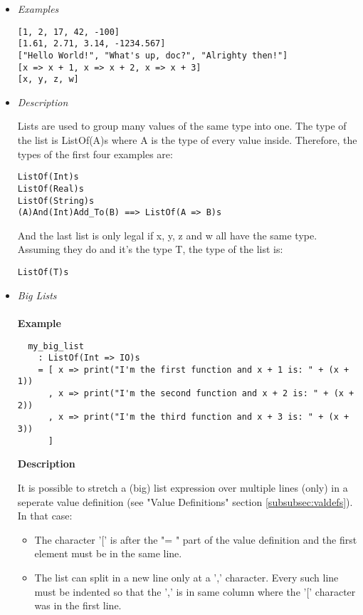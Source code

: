 \documentclass{article}
\begin{document}
\begin{itemize}

\item \textit{Examples}
\begin{verbatim}
[1, 2, 17, 42, -100]
[1.61, 2.71, 3.14, -1234.567]
["Hello World!", "What's up, doc?", "Alrighty then!"]
[x => x + 1, x => x + 2, x => x + 3]
[x, y, z, w]
\end{verbatim}

\item \textit{Description}

Lists are used to group many values of the same type into one. 
The type of the list is ListOf(A)s where A is the type of every value inside.
Therefore, the types of the first four examples are:
\begin{verbatim}
ListOf(Int)s
ListOf(Real)s
ListOf(String)s
(A)And(Int)Add_To(B) ==> ListOf(A => B)s
\end{verbatim}
And the last list is only legal if x, y, z and w all have the same type. Assuming 
they do and it's the type T, the type of the list is: 
\begin{verbatim}
ListOf(T)s
\end{verbatim}

\item \textit{Big Lists}
  \\\\
  \textbf{Example}

  \begin{verbatim}
  my_big_list
    : ListOf(Int => IO)s
    = [ x => print("I'm the first function and x + 1 is: " + (x + 1))
      , x => print("I'm the second function and x + 2 is: " + (x + 2))
      , x => print("I'm the third function and x + 3 is: " + (x + 3))
      ]
  \end{verbatim}

  \textbf{Description} 

  It is possible to stretch a (big) list expression over multiple lines (only) in
  a seperate value definition (see "Value Definitions" section
  \ref{subsubsec:valdefs}).  In that case:
  \begin{itemize}
  \item
  The character '[' is after the "= " part of the value definition
  and the first element must be in the same line.

  \item
  The list can split in a new line only at a ',' character. Every such line must
  be indented so that the ',' is in same column where the '[' character was in
  the first line.


\end{itemize}
\end{itemize}
\end{document}
